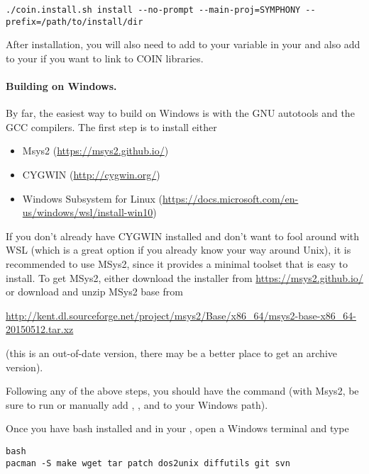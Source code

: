 {\color{Brown}
\begin{verbatim}
./coin.install.sh install --no-prompt --main-proj=SYMPHONY --prefix=/path/to/install/dir
\end{verbatim}
}

After installation, you will also need to add  to your
 variable in your  and also add 
to your  if you want to link to COIN libraries. 

\paragraph{Building on Windows.}

By far, the easiest way to build on Windows is with the GNU autotools and the
GCC compilers. The first step is to install either
\begin{itemize}
\item Msys2 (\url{https://msys2.github.io/})
\item CYGWIN (\url{http://cygwin.org/})
\item Windows Subsystem for Linux (\url{https://docs.microsoft.com/en-us/windows/wsl/install-win10})
\end{itemize}
If you don't already have CYGWIN installed and don't want to fool around with
WSL (which is a great option if you already know your way around Unix), it is
recommended to use MSys2, since it provides a minimal toolset that is easy to
install. To get MSys2, either download the installer from
\url{https://msys2.github.io/} or download and unzip MSys2 base from
\begin{center}
  \url{http://kent.dl.sourceforge.net/project/msys2/Base/x86\_64/msys2-base-x86\_64-20150512.tar.xz}
\end{center}
(this is an out-of-date version, there may be a better place to get an archive
version).

Following any of the above steps, you should have the  command
(with Msys2, be sure to run  
or manually add , , and
 to your Windows path).   

Once you have bash installed and in your , open a Windows terminal and
type 

{\color{Brown}
\begin{verbatim}
bash
pacman -S make wget tar patch dos2unix diffutils git svn
\end{verbatim}
}

